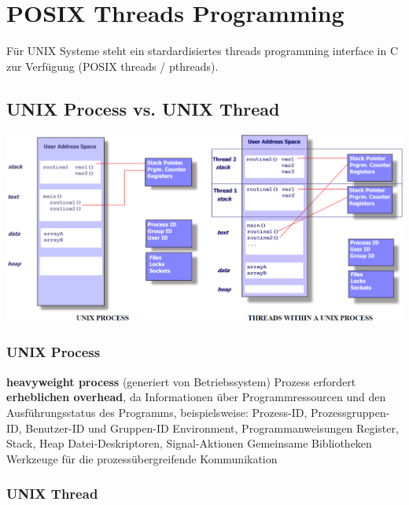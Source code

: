 \section{POSIX Threads Programming}

Für UNIX Systeme steht ein stardardisiertes threads programming interface in C zur Verfügung (POSIX threads / pthreads).


\subsection{UNIX Process vs. UNIX Thread}

\begin{center}
    \includegraphics[width=0.75\columnwidth]{images/posix_process_threads.png}
\end{center}


\subsubsection{UNIX Process}

\begin{outline}
    \1 \textbf{heavyweight process} (generiert von Betriebssystem)
    \1 Prozess erfordert \textbf{erheblichen overhead}, da Informationen über Programmressourcen und 
        den Ausführungsstatus des Programms, beispielsweise:
        \2 Prozess-ID, Prozessgruppen-ID, Benutzer-ID und Gruppen-ID
        \2 Environment, Programmanweisungen
        \2 Register, Stack, Heap
        \2 Datei-Deskriptoren, Signal-Aktionen
        \2 Gemeinsame Bibliotheken
        \2 Werkzeuge für die prozessübergreifende Kommunikation
\end{outline}


\subsubsection{UNIX Thread}

